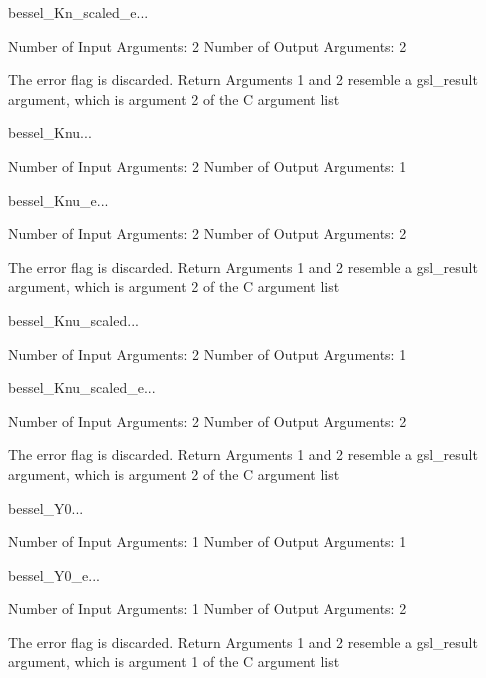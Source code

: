 \begin{funcdesc}{bessel_Kn_scaled_e}{...}

    Number of Input  Arguments:  2
    Number of Output Arguments:  2

The error flag is discarded.
Return Arguments 1 and 2 resemble a gsl_result argument,
	which is  argument 2 of the C argument list

\end{funcdesc}

\begin{funcdesc}{bessel_Knu}{...}

    Number of Input  Arguments:  2
    Number of Output Arguments:  1
\end{funcdesc}

\begin{funcdesc}{bessel_Knu_e}{...}

    Number of Input  Arguments:  2
    Number of Output Arguments:  2

The error flag is discarded.
Return Arguments 1 and 2 resemble a gsl_result argument,
	which is  argument 2 of the C argument list

\end{funcdesc}

\begin{funcdesc}{bessel_Knu_scaled}{...}

    Number of Input  Arguments:  2
    Number of Output Arguments:  1
\end{funcdesc}

\begin{funcdesc}{bessel_Knu_scaled_e}{...}

    Number of Input  Arguments:  2
    Number of Output Arguments:  2

The error flag is discarded.
Return Arguments 1 and 2 resemble a gsl_result argument,
	which is  argument 2 of the C argument list

\end{funcdesc}

\begin{funcdesc}{bessel_Y0}{...}

    Number of Input  Arguments:  1
    Number of Output Arguments:  1
\end{funcdesc}

\begin{funcdesc}{bessel_Y0_e}{...}

    Number of Input  Arguments:  1
    Number of Output Arguments:  2

The error flag is discarded.
Return Arguments 1 and 2 resemble a gsl_result argument,
	which is  argument 1 of the C argument list

\end{funcdesc}


